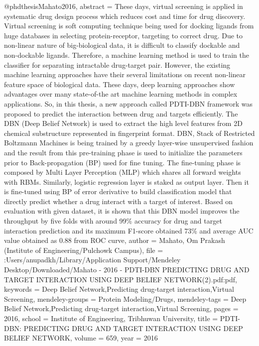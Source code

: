 @phdthesis{Mahato2016,
abstract = {These days, virtual screening is applied in systematic drug design process which reduces cost and time for drug discovery. Virtual screening is soft computing technique being used for docking ligands from huge databases in selecting protein-receptor, targeting to correct drug. Due to non-linear nature of big-biological data, it is difficult to classify dockable and non-dockable ligands. Therefore, a machine learning method is used to train the classifier for separating intractable drug-target pair. However, the existing machine learning approaches have their several limitations on recent non-linear feature space of biological data. These days, deep learning approaches show advantages over many state-of-the art machine learning methods in complex applications. So, in this thesis, a new approach called PDTI-DBN framework was proposed to predict the interaction between drug and targets efficiently. The DBN (Deep Belief Network) is used to extract the high level features from 2D chemical substructure represented in fingerprint format. DBN, Stack of Restricted Boltzmann Machines is being trained by a greedy layer-wise unsupervised fashion and the result from this pre-training phase is used to initialize the parameters prior to Back-propagation (BP) used for fine tuning. The fine-tuning phase is composed by Multi Layer Perception (MLP) which shares all forward weights with RBMs. Similarly, logistic regression layer is staked as output layer. Then it is fine-tuned using BP of error derivative to build classification model that directly predict whether a drug interact with a target of interest. Based on evaluation with given dataset, it is shown that this DBN model improves the throughput by five folds with around 99{\%} accuracy for drug and target interaction prediction and its maximum F1-score obtained 73{\%} and average AUC value obtained as 0.88 from ROC curve},
author = {Mahato, Om Prakash (Institute of Engineering/Pulchowk Campus)},
file = {:Users/anupadkh/Library/Application Support/Mendeley Desktop/Downloaded/Mahato - 2016 - PDTI-DBN PREDICTING DRUG AND TARGET INTERACTION USING DEEP BELIEF NETWORK(2).pdf:pdf},
keywords = {Deep Belief Network,Predicting drug-target interaction,Virtual Screening},
mendeley-groups = {Protein Modeling/Drugs},
mendeley-tags = {Deep Belief Network,Predicting drug-target interaction,Virtual Screening},
pages = {2016},
school = {Institute of Engineering, Tribhuwan University},
title = {{PDTI-DBN: PREDICTING DRUG AND TARGET INTERACTION USING DEEP BELIEF NETWORK}},
volume = {659},
year = {2016}
}
